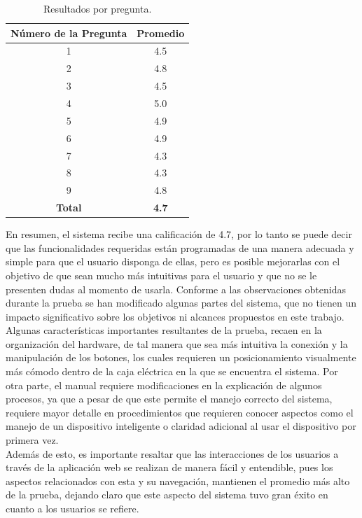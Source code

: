 \begin{table}
	\begin{center}
		\caption{Resultados por pregunta.}
		\label{table:enc}
		\begin{tabular}{|c|c|}
			\hline 
			\textbf{Número de la Pregunta} & \textbf{Promedio} \\ 
			\hline 
			1 & 4.5\\ 
			\hline 
			2 & 4.8\\ 
			\hline 
			3 & 4.5\\ 
			\hline 
			4 & 5.0\\ 
			\hline 
			5 & 4.9\\ 
			\hline 
			6 & 4.9\\ 
			\hline 
			7 & 4.3\\ 
			\hline 
			8 & 4.3\\ 
			\hline 
			9 & 4.8\\ 
			\hline 
			\textbf{Total} & \textbf{4.7}\\ 
			\hline 
		\end{tabular} 
	\end{center}
\end{table}

En resumen, el sistema recibe una calificación de 4.7, por lo tanto se puede decir que las funcionalidades requeridas están programadas de una manera adecuada y simple para que el usuario disponga de ellas, pero es posible mejorarlas con el objetivo de que sean mucho más intuitivas para el usuario y que no se le presenten dudas al momento de usarla. Conforme a las observaciones obtenidas durante la prueba se han modificado algunas partes del sistema, que no tienen un impacto significativo sobre los objetivos ni alcances propuestos en este trabajo.\\

Algunas características importantes resultantes de la prueba, recaen en la organización del hardware, de tal manera que sea más intuitiva la conexión y la manipulación de los botones, los cuales requieren un posicionamiento visualmente más cómodo dentro de la caja eléctrica en la que se encuentra el sistema. Por otra parte, el manual requiere modificaciones en la explicación de algunos procesos, ya que a pesar de que este permite el manejo correcto del sistema, requiere mayor detalle en procedimientos que requieren conocer aspectos como el manejo de un dispositivo inteligente o claridad adicional al usar el dispositivo por primera vez.\\

Además de esto, es importante resaltar que las interacciones de los usuarios a través de la aplicación web se realizan de manera fácil y entendible, pues los aspectos relacionados con esta y su navegación, mantienen el promedio más alto de la prueba, dejando claro que este aspecto del sistema tuvo gran éxito en cuanto a los usuarios se refiere.\\